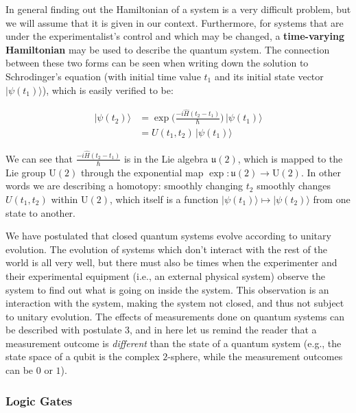 \documentclass{article}
\theoremstyle{definition}
\begin{document}
    In general finding out the Hamiltonian of a system is a very difficult problem, but we will assume that it is given in our context. Furthermore, for systems that are under the experimentalist's control and which may be changed, a \textbf{time-varying Hamiltonian} may be used to describe the quantum system. The connection between these two forms can be seen when writing down the solution to Schrodinger's equation (with initial time value $t_1$ and its initial state vector $|\psi (t_1)\rangle$), which is easily verified to be:

    \begin{align*}
      |\psi (t_2) \rangle & = \exp \bigg( \frac{-i \hat{H} (t_2 - t_1)}{\hbar} \bigg) \, |\psi(t_1)\rangle \\
      & = U(t_1, t_2) \, |\psi (t_1) \rangle
    \end{align*}

    We can see that $\frac{-i \hat{H} (t_2 - t_1)}{\hbar}$ is in the Lie algebra $\mathfrak{u}(2)$, which is mapped to the Lie group $\text{U}(2)$ through the exponential map $\exp: \mathfrak{u}(2) \longrightarrow \text{U}(2)$. In other words we are describing a homotopy: smoothly changing $t_2$ smoothly changes $U(t_1, t_2)$ within $\text{U}(2)$, which itself is a function $|\psi (t_1) \rangle \mapsto | \psi (t_2) \rangle$ from one state to another.

    We have postulated that closed quantum systems evolve according to unitary evolution. The evolution of systems which don't interact with the rest of the world is all very well, but there must also be times when the experimenter and their experimental equipment (i.e., an external physical system) observe the system to find out what is going on inside the system. This observation is an interaction with the system, making the system not closed, and thus not subject to unitary evolution. The effects of measurements done on quantum systems can be described with postulate 3, and in here let us remind the reader that a measurement outcome is \textit{different} than the state of a quantum system (e.g., the state space of a qubit is the complex $2$-sphere, while the measurement outcomes can be $0$ or $1$).

    \subsubsection{Logic Gates}
\end{document}
